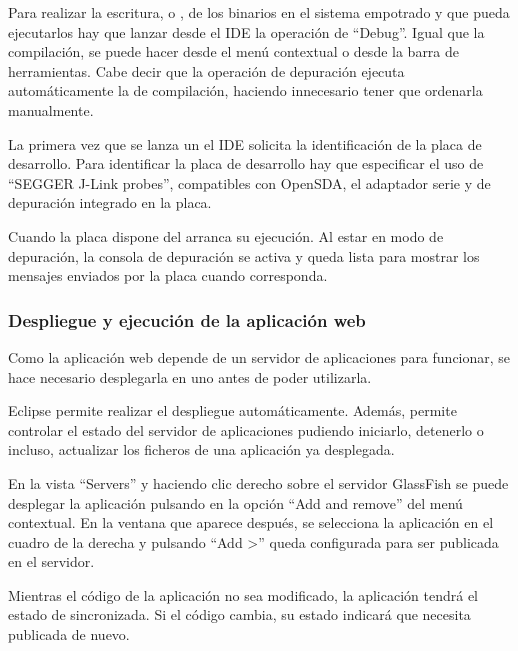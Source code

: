 Para realizar la escritura, o , de los binarios en el
sistema empotrado y que pueda ejecutarlos hay que lanzar desde el IDE la
operación de ``Debug''. Igual que la compilación, se puede hacer desde el menú
contextual o desde la barra de herramientas. Cabe decir que la operación de
depuración ejecuta automáticamente la de compilación, haciendo innecesario tener
que ordenarla manualmente.

La primera vez que se lanza un  el IDE solicita la
identificación de la placa de desarrollo. Para identificar la placa de
desarrollo hay que especificar el uso de ``SEGGER J-Link probes'', 
compatibles con OpenSDA, el adaptador serie y de depuración integrado en la
placa. 



Cuando la placa dispone del \sw{} arranca su ejecución. Al estar en modo de
depuración, la consola de depuración se activa y queda lista para mostrar los
mensajes enviados por la placa cuando corresponda.



\subsubsection{Despliegue y ejecución de la aplicación web} \label{sec:exe-aw}
Como la aplicación web depende de un servidor de aplicaciones para funcionar,
se hace necesario desplegarla en uno antes de poder utilizarla.

Eclipse permite realizar el despliegue automáticamente. Además, permite
controlar el estado del servidor de aplicaciones pudiendo iniciarlo, detenerlo o
incluso, actualizar los ficheros de una aplicación ya desplegada.

En la vista ``Servers'' y haciendo clic derecho sobre el servidor GlassFish
se puede desplegar la aplicación pulsando en la opción ``Add and remove'' del
menú contextual. En la ventana que aparece después, se selecciona la aplicación
en el cuadro de la derecha y pulsando ``Add >'' queda configurada para ser
publicada en el servidor.


Mientras el código de la aplicación no sea modificado, la aplicación tendrá el
estado de sincronizada. Si el código cambia, su estado indicará que necesita
publicada de nuevo.

